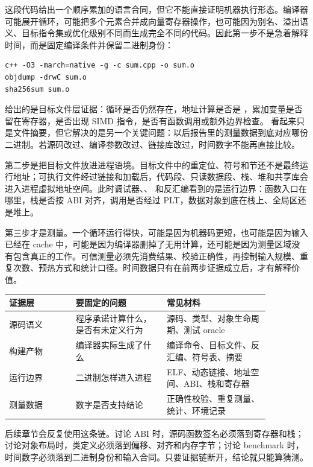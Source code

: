 这段代码给出一个顺序累加的语言合同，但它不能直接证明机器执行形态。编译器可能展开循环，可能把多个元素合并成向量寄存器操作，也可能因为别名、溢出语义、目标指令集或优化级别不同而生成完全不同的代码。因此第一步不是急着解释时间，而是固定编译条件并保留二进制身份：

\begin{lstlisting}[numbers=none,caption={固定构建和二进制身份}]
c++ -O3 -march=native -g -c sum.cpp -o sum.o
objdump -drwC sum.o
sha256sum sum.o
\end{lstlisting}

 给出的是目标文件层证据：循环是否仍然存在，地址计算是否是 ，累加变量是否留在寄存器，是否出现 SIMD 指令，是否有函数调用或额外边界检查。 看起来只是文件摘要，但它解决的是另一个关键问题：以后报告里的测量数据到底对应哪份二进制。若源码改过、编译参数改过、链接库改过，时间数字不能再直接比较。

第二步是把目标文件放进进程语境。目标文件中的重定位、符号和节还不是最终运行地址；可执行文件经过链接和加载后，代码段、只读数据段、栈、堆和共享库会进入进程虚拟地址空间。此时调试器、、 和反汇编看到的是运行边界：函数入口在哪里，栈是否按 ABI 对齐，调用是否经过 PLT，数据对象到底在栈上、全局区还是堆上。

第三步才是测量。一个循环运行得快，可能是因为机器码更短，也可能是因为输入已经在 cache 中，可能是因为编译器删掉了无用计算，还可能是因为测量区域没有包含真正的工作。可信测量必须先消费结果、校验正确性，再控制输入规模、重复次数、预热方式和统计口径。时间数据只有在前两步证据成立后，才有解释价值。

\begin{center}
\begin{tabular}{p{0.22\linewidth}p{0.30\linewidth}p{0.34\linewidth}}
\toprule
证据层 & 要固定的问题 & 常见材料 \\
\midrule
源码语义 & 程序承诺计算什么，是否有未定义行为 & 源码、类型、对象生命周期、测试 oracle \\
构建产物 & 编译器实际生成了什么 & 编译命令、目标文件、反汇编、符号表、摘要 \\
运行边界 & 二进制怎样进入进程 & ELF、动态链接、地址空间、ABI、栈和寄存器 \\
测量数据 & 数字是否支持结论 & 正确性校验、重复测量、统计、环境记录 \\
\bottomrule
\end{tabular}
\end{center}

后续章节会反复使用这条链。讨论 ABI 时，源码函数签名必须落到寄存器和栈；讨论对象布局时，类定义必须落到偏移、对齐和内存字节；讨论 benchmark 时，时间数字必须落到二进制身份和输入合同。只要证据链断开，结论就只能算猜测。

